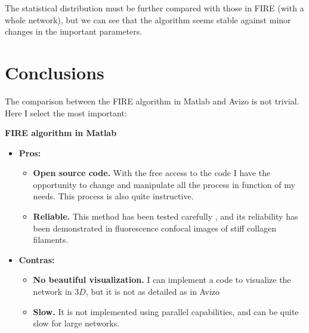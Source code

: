 The statistical distribution must be further compared with those in FIRE (with
a whole network), but we can see that the algorithm seems stable against minor
changes in the important parameters.

\section{Conclusions}
The comparison between the FIRE algorithm in Matlab and Avizo is not trivial.
Here I select the most important:

{\large\textbf{FIRE algorithm in Matlab}}
\begin{itemize}
\item \textbf{Pros:}

\begin{itemize}
  \item \textbf{Open source code.} With the free access to the code I have the
  opportunity to change and manipulate all the process in function of my needs.
  This process is also quite instructive. 

  \item \textbf{Reliable.} This method has been tested carefully
\citep{stein_mathematical_2007}, and its reliability has been demonstrated in fluorescence confocal
images of stiff collagen filaments.
\end{itemize}
\item  \textbf{Contras:}
\begin{itemize}
  \item \textbf{No beautiful visualization.} I can implement a code to visualize
  the network in $3D$, but it is not as detailed as in Avizo
  \item \textbf{Slow.} It is not implemented using parallel capabilities, and
  can be quite slow for large networks.
\end{itemize}
\end{itemize}


